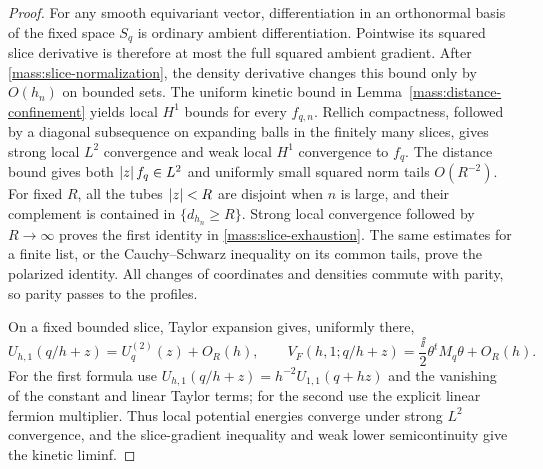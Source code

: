 \begin{proof}
For any smooth equivariant vector, differentiation in an orthonormal
basis of the fixed space \(S_q\) is ordinary ambient
differentiation. Pointwise its squared slice derivative is therefore
at most the full squared ambient gradient. After
\eqref{mass:slice-normalization}, the density derivative changes this
bound only by \(O(h_n)\) on bounded sets. The uniform kinetic bound
in Lemma~\ref{mass:distance-confinement} yields local \(H^1\) bounds
for every \(f_{q,n}\). Rellich compactness, followed by a diagonal
subsequence on expanding balls in the finitely many slices, gives
strong local \(L^2\) convergence and weak local \(H^1\) convergence
to \(f_q\). The distance bound gives both
\(\left\lvert z\right\rvert f_q\in L^2\) and uniformly small squared norm tails
\(O(R^{-2})\). For fixed \(R\), all the tubes \(\left\lvert z\right\rvert<R\)
are disjoint when \(n\) is large, and their complement is contained
in \(\{d_{h_n}\geq R\}\). Strong local convergence followed by
\(R\to\infty\) proves the first identity in
\eqref{mass:slice-exhaustion}. The same estimates for a finite list,
or the Cauchy--Schwarz inequality on its common tails, prove the
polarized identity. All changes of coordinates and densities commute
with parity, so parity passes to the profiles.

On a fixed bounded slice, Taylor expansion gives, uniformly there,
\begin{equation}
\label{mass:slice-potential-limit}
 U_{h,1}(q/h+z)=U_q^{(2)}(z)+O_R(h),\qquad
 V_F(h,1;q/h+z)=\frac{\ii}{2}\theta^tM_q\theta+O_R(h).
\end{equation}
For the first formula use
\(U_{h,1}(q/h+z)=h^{-2}U_{1,1}(q+hz)\) and the vanishing of the
constant and linear Taylor terms; for the second use the explicit
linear fermion multiplier. Thus local potential energies converge
under strong \(L^2\) convergence, and the slice-gradient inequality
and weak lower semicontinuity give the kinetic liminf.


\end{proof}
